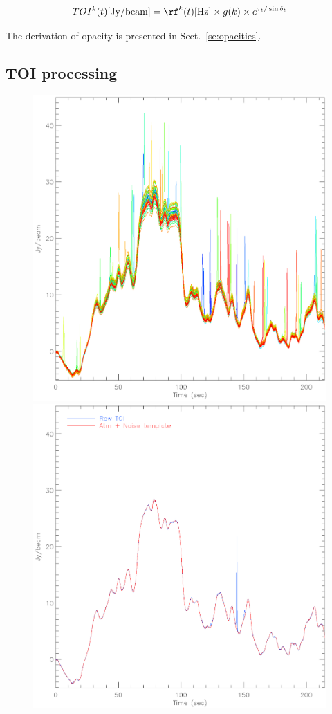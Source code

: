 \begin{equation}
TOI^k(t) [{\rm Jy/beam}] = \rf^k(t)[{\rm Hz}] \times g(k) \times e^{\tau_t/\sin\delta_t}
\end{equation}

The derivation of opacity is presented in Sect.~\ref{se:opacities}.

\subsection{TOI processing}
\label{se:toi_proc}

\begin{figure}[ht!]
\begin{center}
\includegraphics[clip, angle=0, scale=0.4]{Figures/toi_plot.eps}
\includegraphics[clip, angle=0, scale=0.4]{Figures/toi_plot_decorr.eps}

\end{center}
\end{figure}
